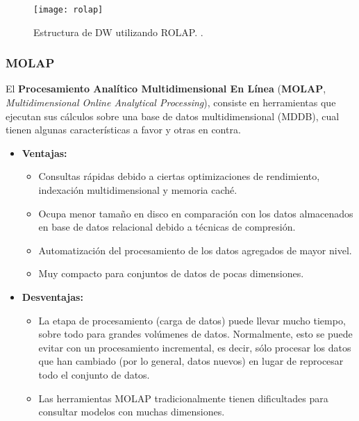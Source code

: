\documentclass[a4paper,11pt]{article}
\begin{document}
    \begin{figure}
      \begin{center}
        \texttt{[image: rolap]}
        \caption{Estructura de DW utilizando ROLAP. \cite[p.~81]{nagabhushana}.}
        \label{rolap}
      \end{center}
    \end{figure}
    
    \subsubsection{MOLAP}
    
    El \textbf{Procesamiento Analítico Multidimensional En Línea} (\textbf{MOLAP}, \textit{Multidimensional Online Analytical Processing}),
    consiste en herramientas que ejecutan sus cálculos sobre una base de datos multidimensional (MDDB), cual tienen algunas características a favor y otras en contra.
    
    \begin{itemize}
      \item \textbf{Ventajas:}
        \begin{itemize}
          \item Consultas rápidas debido a ciertas optimizaciones de rendimiento, indexación multidimensional y memoria caché.
          \item Ocupa menor tamaño en disco en comparación con los datos almacenados en base de datos relacional debido a técnicas de compresión.
          \item Automatización del procesamiento de los datos agregados de mayor nivel.
          \item Muy compacto para conjuntos de datos de pocas dimensiones.
        \end{itemize}
      \item \textbf{Desventajas:}
        \begin{itemize}
          \item La etapa de procesamiento (carga de datos) puede llevar mucho tiempo, sobre todo para grandes volúmenes de datos. Normalmente, esto se
          puede evitar con un procesamiento incremental, es decir, sólo procesar los datos que han cambiado (por lo general, datos nuevos) en lugar de
          reprocesar todo el conjunto de datos.
          \item Las herramientas MOLAP tradicionalmente tienen dificultades para consultar modelos con muchas dimensiones.
        \end{itemize}
    \end{itemize} 
    
\end{document}
